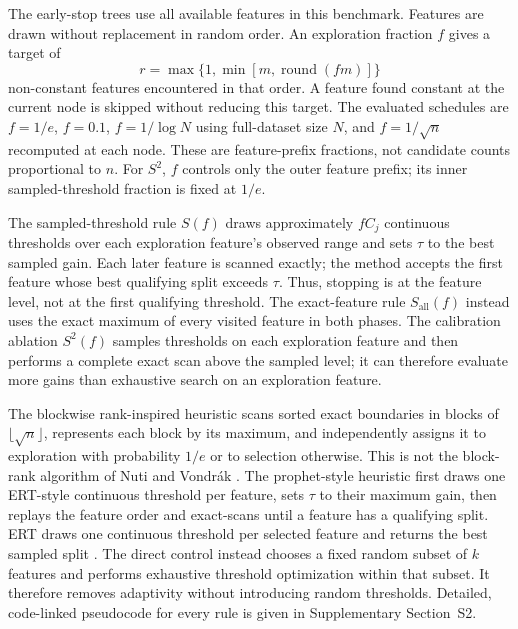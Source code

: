 \documentclass[final,5p,times,twocolumn]{elsarticle}
\begin{document}
The early-stop trees use all available features in this benchmark. Features are drawn without replacement in random order. An exploration fraction \(f\) gives a target of
\[
r=\max\{1,\min[m,\operatorname{round}(fm)]\}
\]
non-constant features encountered in that order. A feature found constant at the current node is skipped without reducing this target. The evaluated schedules are \(f=1/e\), \(f=0.1\), \(f=1/\log N\) using full-dataset size \(N\), and \(f=1/\sqrt n\) recomputed at each node. These are feature-prefix fractions, not candidate counts proportional to \(n\). For \(S^2\), \(f\) controls only the outer feature prefix; its inner sampled-threshold fraction is fixed at \(1/e\).

The sampled-threshold rule \(S(f)\) draws approximately \(fC_j\) continuous thresholds over each exploration feature's observed range and sets \(\tau\) to the best sampled gain. Each later feature is scanned exactly; the method accepts the first feature whose best qualifying split exceeds \(\tau\). Thus, stopping is at the feature level, not at the first qualifying threshold. The exact-feature rule \(S_{\mathrm{all}}(f)\) instead uses the exact maximum of every visited feature in both phases. The calibration ablation \(S^2(f)\) samples thresholds on each exploration feature and then performs a complete exact scan above the sampled level; it can therefore evaluate more gains than exhaustive search on an exploration feature.

The blockwise rank-inspired heuristic scans sorted exact boundaries in blocks of \(\lfloor\sqrt n\rfloor\), represents each block by its maximum, and independently assigns it to exploration with probability \(1/e\) or to selection otherwise. This is not the block-rank algorithm of Nuti and Vondr\'ak \cite{nuti2023single}. The prophet-style heuristic first draws one ERT-style continuous threshold per feature, sets \(\tau\) to their maximum gain, then replays the feature order and exact-scans until a feature has a qualifying split. ERT draws one continuous threshold per selected feature and returns the best sampled split \cite{geurts2006extra}. The direct control instead chooses a fixed random subset of \(k\) features and performs exhaustive threshold optimization within that subset. It therefore removes adaptivity without introducing random thresholds. Detailed, code-linked pseudocode for every rule is given in Supplementary Section~S2.
\end{document}
